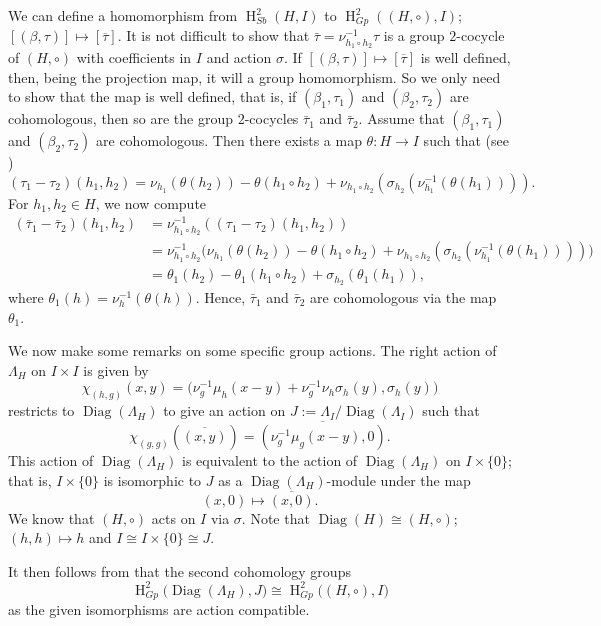 \documentclass[11pt]{amsart}
\theoremstyle{thrm}
\theoremstyle{plain}
\theoremstyle{definition}
\newcommand{\Ho}{\operatorname{H} }
\numberwithin{equation}{section}
\newcommand{\Diag}{\operatorname{Diag} }
\begin{document}
We can define a homomorphism from $\Ho^2_{Sb}(H, I)$ to  $\Ho^2_{Gp}((H, \circ), I)$; $[(\beta, \tau)]\mapsto [\overline{\tau}]$. It is not difficult to show that $\bar{\tau} = \nu^{-1}_{h_1 \circ h_2}\tau$ is a group $2$-cocycle of $(H, \circ)$ with coefficients in $I$ and action $\sigma$. If $[(\beta, \tau)]\mapsto [\overline{\tau}]$ is well defined, then, being the projection map, it will a group homomorphism. So we only need to show that  the map is well defined, that is, if $(\beta_1, \tau_1)$ and $(\beta_2, \tau_2)$ are cohomologous, then so are the group $2$-cocycles $\bar{\tau}_1$ and $\bar{\tau}_2$. Assume that $(\beta_1, \tau_1)$ and $(\beta_2, \tau_2)$ are cohomologous. Then there exists a map $\theta: H \to I$ such that (see  \cite[proof of Theorem 3.6]{RY24})
$$(\tau_1 - \tau_2)(h_1, h_2) = \nu_{h_1}(\theta(h_2)) - \theta(h_1 \circ h_2) + \nu_{h_1 \circ h_2}(\sigma_{h_2}(\nu^{-1}_{h_1}(\theta(h_1)))).$$
For $h_1, h_2 \in H$, we now compute
\begin{align*}
(\bar{\tau}_1 - \bar{\tau}_2)(h_1, h_2) &= \nu^{-1}_{h_1 \circ h_2} \left( (\tau_1 - \tau_2)(h_1, h_2) \right)\\
	&= \nu^{-1}_{h_1 \circ h_2} \big( \nu_{h_1}(\theta(h_2)) - \theta(h_1 \circ h_2) + \nu_{h_1 \circ h_2}(\sigma_{h_2}(\nu^{-1}_{h_1}(\theta(h_1)))) \big)\\
	&= \theta_1(h_2) - \theta_1(h_1 \circ h_2) + \sigma_{h_2}(\theta_1(h_1)),
\end{align*}
where $\theta_1(h) = \nu^{-1}_h(\theta(h))$. Hence, $\bar{\tau}_1$ and $\bar{\tau}_2$ are cohomologous via the map $\theta_1$.




We now make some remarks on some specific group actions. The right action of $\Lambda_H$ on $I \times I$ is given by
	\[
	\chi_{(h,g)}(x,y) = \big(\nu_g^{-1} \mu_h(x - y) + \nu_g^{-1} \nu_h
	\sigma_h(y), \sigma_h(y)\big)
	\]
 restricts  to $\Diag(\Lambda_H)$ to give an action on $J := \Lambda_I / \Diag(\Lambda_I)$
such that
	\[
	\chi_{(g,g)}(\overline{(x, y)}) = \overline{(\nu_g^{-1} \mu_g(x - y), 0)}.
	\]
	This action of $\Diag(\Lambda_H)$ is equivalent to the action of $\Diag(\Lambda_H)$ on $I \times \{0\}$; that is, $I \times \{0\}$ is isomorphic to $J$ as a $\Diag(\Lambda_H)$-module under the map
	\[
	(x, 0) \mapsto \overline{(x, 0)}.
	\]
We know that $(H, \circ)$ acts on $I$ via $\sigma$. Note that $\Diag(H) \cong (H, \circ)$; $(h, h) \mapsto h$ and $I \cong I \times \{0\} \cong J$. 

It then follows from  \cite[Proposition 2.2] {PSY18} that the second cohomology groups 
$$\Ho^2_{Gp}\big(\Diag(\Lambda_H), J \big)  \cong \Ho^2_{Gp}\big((H, \circ), I\big)$$
as the given  isomorphisms are action compatible. 
\end{document}
